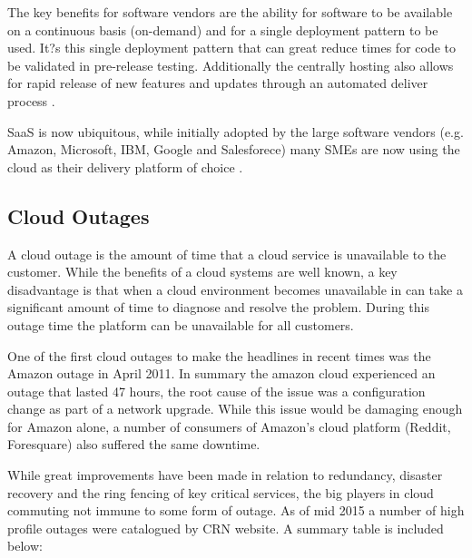 \documentclass[conference]{IEEEtran}
\begin{document}
The key benefits for software vendors are the ability for software to be available on a continuous basis (on-demand) and for a single deployment pattern to be used. It?s this single deployment pattern that can great reduce times for code to be validated in pre-release testing. Additionally the centrally hosting also allows for rapid release of new features and updates through an automated deliver process \cite{datacentre2015}. \par
SaaS is now ubiquitous, while initially adopted by the large software vendors (e.g. Amazon, Microsoft, IBM, Google and Salesforece) many SMEs are now using the cloud as their delivery platform of choice \cite{CRN2015prviders,}. \par

\subsection{Cloud Outages}
A cloud outage is the amount of time that a cloud service is unavailable to the customer. While the benefits of a cloud systems are well known, a key disadvantage is that when a cloud environment becomes unavailable in can take a significant amount of time to diagnose and resolve the problem. During this outage time the platform can be unavailable for all customers. \par

One of the first cloud outages to make the headlines in recent times was the Amazon outage in April 2011.  In summary the amazon cloud experienced an outage that lasted 47 hours, the root cause of the issue was a configuration change as part of a network upgrade. While this issue would be damaging enough for Amazon alone, a number of consumers of Amazon's cloud platform (Reddit, Foresquare) also suffered the same downtime. \cite{InfoWorld2015outage} \par

While great improvements have been made in relation to redundancy, disaster recovery and the ring fencing of key critical services, the big players in cloud commuting not immune to some form of outage. As of mid 2015 a number of high profile outages were catalogued by CRN website. \cite {CRN2015outage} A summary table is included below: \par
\end{document}
